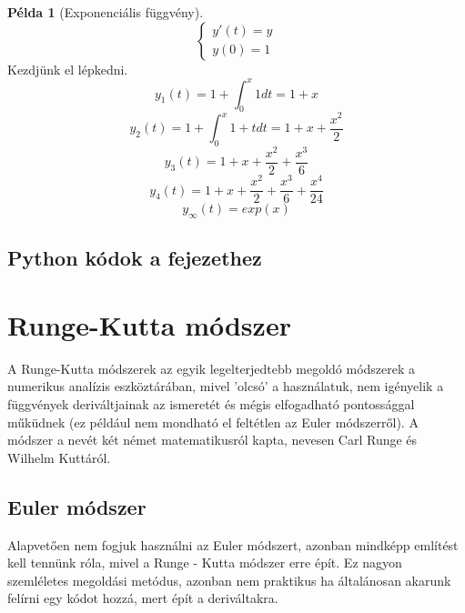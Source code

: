 \documentclass{article}
\theoremstyle{definition}
\theoremstyle{theorem}
\newtheorem{example}{Példa}
\begin{document}
\begin{example}[Exponenciális függvény]
\begin{equation*}
    \begin{cases}
       y'(t) = y\\
       y(0) = 1
    \end{cases}       
\end{equation*}
Kezdjünk el lépkedni.
\begin{equation*}
    y_1(t) = 1 + \int_0^x 1 dt = 1 + x
\end{equation*}
\begin{equation*}
    y_2(t) = 1 + \int_0^x 1+t dt = 1 + x + \frac{x^2}{2}
\end{equation*}
\begin{equation*}
    y_3(t) =  1 + x + \frac{x^2}{2} + \frac{x^3}{6}
\end{equation*}
\begin{equation*}
    y_4(t) = 1 + x + \frac{x^2}{2} + \frac{x^3}{6} + \frac{x^4}{24}
\end{equation*}
\begin{equation*}
    y_{\infty}(t) = exp(x)
\end{equation*}
\end{example}
\subsection{Python kódok a fejezethez}

\section{Runge-Kutta módszer}
A Runge-Kutta módszerek az egyik legelterjedtebb megoldó módszerek a numerikus analízis eszköztárában, mivel 'olcsó' a használatuk, nem igényelik a függvények deriváltjainak az ismeretét és mégis elfogadható pontossággal műküdnek (ez például nem mondható el feltétlen az Euler módszerről). A módszer a nevét két német matematikusról kapta, nevesen Carl Runge és Wilhelm Kuttáról.

\subsection{Euler módszer}
Alapvetően nem fogjuk használni az Euler módszert, azonban mindképp említést kell tennünk róla, mivel a Runge - Kutta módszer erre épít. Ez nagyon szemléletes megoldási metódus, azonban nem praktikus ha általánosan akarunk felírni egy kódot hozzá, mert épít a deriváltakra.\\
\end{document}
